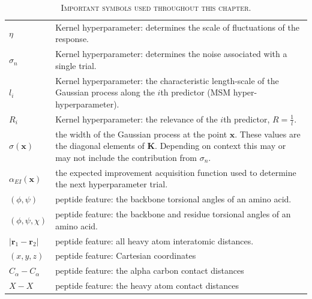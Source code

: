 \begin{table}
\begin{tabularx}{0.9\textwidth}{ l >{\raggedright\arraybackslash}X  }
        $\eta$ & Kernel hyperparameter: determines the scale of fluctuations of the response. \\
        $\sigma_{n}$ & Kernel hyperparameter: determines the noise associated with a single trial. \\
        $l_{i}$ & Kernel hyperparameter: the characteristic length-scale of the Gaussian process 
                along the $i$th predictor (MSM hyper-hyperparameter).\\
        $R_{i}$ & Kernel hyperparameter: the relevance of the $i$th predictor, $R=\frac{1}{l}$. \\ 
        $\sigma(\mathbf{x})$ & the width of the Gaussian process at the point $\mathbf{x}$. These values  are the diagonal elements of $\mathbf{K}$. Depending on context this may or may not include the contribution from $\sigma_{n}$. \\
        $\alpha_{EI}(\mathbf{x})$ & the expected improvement acquisition function used to determine the next hyperparameter trial. \\
        $(\phi, \psi)$ & peptide feature: the backbone torsional angles of an amino acid.  \\
        $(\phi, \psi, \chi)$ & peptide feature: the backbone and residue torsional angles of an amino acid. \\
        $|\mathbf{r}_{1}-\mathbf{r}_{2}|$ & peptide feature: all heavy atom interatomic distances.  \\
        $(x, y, z)$ & peptide feature: Cartesian coordinates \\
        $C_{\alpha}-C_{\alpha}$ & peptide feature: the alpha carbon contact distances \\
        $X-X$ & peptide feature: the heavy atom contact distances \\
     \hline
     \end{tabularx}
     \caption[Important symbols]{\textsc{Important symbols used throughout this chapter}.}

    \label{tab:msm_symbols}
\end{table}

